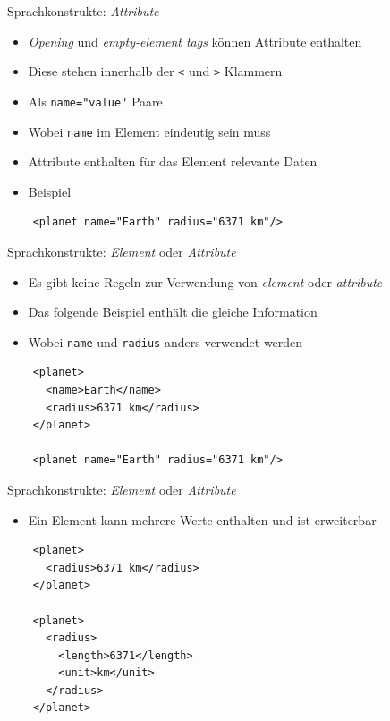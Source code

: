 \documentclass{beamer}
\begin{document}
\begin{frame}[fragile]{Sprachkonstrukte: \emph{Attribute}}
	
	\begin{itemize}
		\item \emph{Opening} und \emph{empty-element tags} können Attribute enthalten
		\item Diese stehen innerhalb der \texttt{<} und \texttt{>} Klammern
		\item Als \texttt{name="value"} Paare 
		\item Wobei \texttt{name} im Element eindeutig sein muss
		\item Attribute enthalten für das Element relevante Daten
		\item Beispiel
	\end{itemize}
	
	\begin{lstlisting}
	<planet name="Earth" radius="6371 km"/>
	\end{lstlisting}
	
\end{frame}

\begin{frame}[fragile]{Sprachkonstrukte: \emph{Element} oder \emph{Attribute}}
	
	\begin{itemize}
		\item Es gibt keine Regeln zur Verwendung von \emph{element} oder \emph{attribute}
		\item Das folgende Beispiel enthält die gleiche Information
		\item Wobei \texttt{name} und \texttt{radius} anders verwendet werden
	\end{itemize}
	
	\begin{lstlisting}
	<planet>
	  <name>Earth</name>
	  <radius>6371 km</radius>
	</planet>
	
	<planet name="Earth" radius="6371 km"/>
	\end{lstlisting}
	
\end{frame}

\begin{frame}[fragile]{Sprachkonstrukte: \emph{Element} oder \emph{Attribute}}
	
	\begin{itemize}
		\item Ein Element kann mehrere Werte enthalten und ist erweiterbar 
	\end{itemize}
	
	\begin{lstlisting}
	<planet>
	  <radius>6371 km</radius>
	</planet>
	
	<planet>
	  <radius>
	    <length>6371</length>
	    <unit>km</unit>
	  </radius>
	</planet>
	\end{lstlisting}
	
\end{frame}
\end{document}
